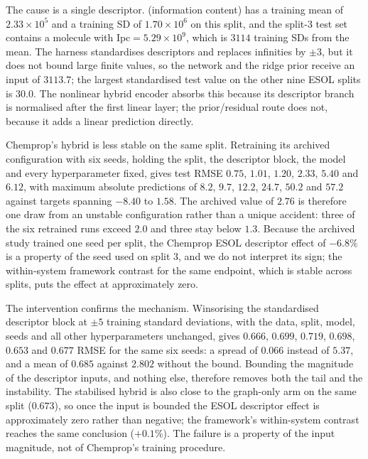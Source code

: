 The cause is a single descriptor.  (information content) has a training mean of $2.33\times10^{5}$ and a training SD of $1.70\times10^{6}$ on this split, and the split-3 test set contains a molecule with $\mathrm{Ipc}=5.29\times10^{9}$, which is $3114$ training SDs from the mean. The harness standardises descriptors and replaces infinities by $\pm3$, but it does not bound large finite values, so the network and the ridge prior receive an input of $3113.7$; the largest standardised test value on the other nine ESOL splits is $30.0$. The nonlinear hybrid encoder absorbs this because its descriptor branch is normalised after the first linear layer; the prior/residual route does not, because it adds a linear prediction directly.

Chemprop's hybrid is less stable on the same split. Retraining its archived configuration with six seeds, holding the split, the descriptor block, the model and every hyperparameter fixed, gives test RMSE $0.75$, $1.01$, $1.20$, $2.33$, $5.40$ and $6.12$, with maximum absolute predictions of $8.2$, $9.7$, $12.2$, $24.7$, $50.2$ and $57.2$ against targets spanning $-8.40$ to $1.58$. The archived value of $2.76$ is therefore one draw from an unstable configuration rather than a unique accident: three of the six retrained runs exceed $2.0$ and three stay below $1.3$. Because the archived study trained one seed per split, the Chemprop ESOL descriptor effect of $-6.8\%$ is a property of the seed used on split 3, and we do not interpret its sign; the within-system framework contrast for the same endpoint, which is stable across splits, puts the effect at approximately zero.

The intervention confirms the mechanism. Winsorising the standardised descriptor block at $\pm5$ training standard deviations, with the data, split, model, seeds and all other hyperparameters unchanged, gives $0.666$, $0.699$, $0.719$, $0.698$, $0.653$ and $0.677$ RMSE for the same six seeds: a spread of $0.066$ instead of $5.37$, and a mean of $0.685$ against $2.802$ without the bound. Bounding the magnitude of the descriptor inputs, and nothing else, therefore removes both the tail and the instability. The stabilised hybrid is also close to the graph-only arm on the same split ($0.673$), so once the input is bounded the ESOL descriptor effect is approximately zero rather than negative; the framework's within-system contrast reaches the same conclusion ($+0.1\%$). The failure is a property of the input magnitude, not of Chemprop's training procedure.

